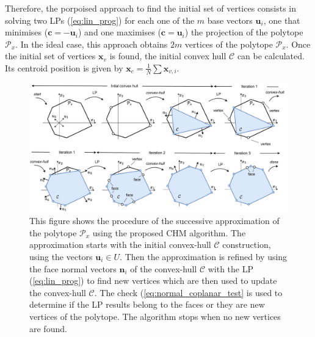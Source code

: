 Therefore, the porpoised approach to find the initial set of vertices consists in solving two LPs (\ref{eq:lin_prog}) for each one of the $m$ base vectors $\bm{u}_i$, one that minimises ($\bm{c} = -\bm{u}_i$) and one maximises ($\bm{c} = \bm{u}_i$) the projection of the polytope $\mathcal{P}_x$. In the ideal case, this approach obtains $2m$ vertices of the polytope $\mathcal{P}_x$. Once the initial set of vertices $\bm{x}_v$ is found, the initial convex hull $\mathcal{C}$ can be calculated. Its centroid position is given by $\bm{x}_c\!=\!\frac{1}{N}\!\sum\bm{x}_{v,i}$. 



\begin{figure}[!t]
    \centering
    \includegraphics[width=\linewidth]{Papers/images/ichm_full.pdf}
    \vspace{-0.8cm}
    \caption{This figure shows the procedure of the successive approximation of the polytope $\mathcal{P}_x$ using the proposed CHM algorithm. The approximation starts with the initial convex-hull $\mathcal{C}$ construction, using the vectors $\bm{u}_i\in U$. Then the approximation is refined by using the face normal vectors $\bm{n}_i$ of the convex-hull $\mathcal{C}$ with the LP (\ref{eq:lin_prog}) to find new vertices which are then used to update the convex-hull $\mathcal{C}$. The check (\ref{eq:normal_coplanar_test} is used to determine if the LP results belong to the faces or they are new vertices of the polytope. The algorithm stops when no new vertices are found. }
    \label{fig:algo_example}
\end{figure}


